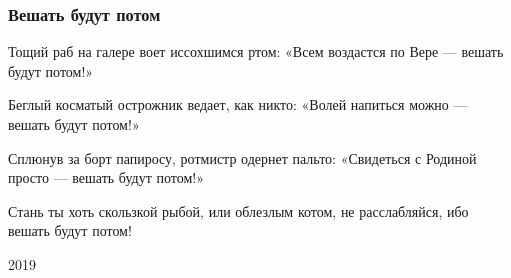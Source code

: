  
 
 

\subsubsection{Вешать будут потом}

Тощий раб на галере
воет иссохшимся ртом:
«Всем воздастся по Вере —
вешать будут потом!»

Беглый косматый острожник
ведает, как никто:
«Волей напиться можно —
вешать будут потом!»

Сплюнув за борт папиросу,
ротмистр одернет пальто:
«Свидеться с Родиной просто —
вешать будут потом!»

Стань ты хоть скользкой рыбой,
или облезлым котом,
не расслабляйся, ибо
вешать будут потом!

2019
